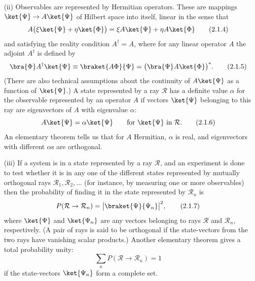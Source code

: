 \medskip
\noindent
(ii) Observables are represented by Hermitian operators. These are
mappings $\ket{\Psi}\to A\ket{\Psi}$ of Hilbert space into itself,
linear in the sense that
\begin{equation}
  A\bigl(\xi\ket{\Psi}+\eta\ket{\Phi}\bigr)
    =\xi A\ket{\Psi}+\eta A\ket{\Phi}
  \tag{2.1.4}\label{eq:2.1.4}
\end{equation}
and satisfying the reality condition $A^{\dagger}=A$, where for any
linear operator $A$ the adjoint $A^{\dagger}$ is defined by
\begin{equation}
  \bra{\Phi}A^{\dagger}\ket{\Psi}
    \equiv \braket{A\Phi}{\Psi}
    =\bigl(\bra{\Psi}A\ket{\Phi}\bigr)^{*}.
  \tag{2.1.5}\label{eq:2.1.5}
\end{equation}
(There are also technical assumptions about the continuity of
$A\ket{\Psi}$ as a function of $\ket{\Psi}$.) A state represented by a ray
$\mathcal{R}$ has a definite value $\alpha$ for the observable represented
by an operator $A$ if vectors $\ket{\Psi}$ belonging to this ray are
eigenvectors of $A$ with eigenvalue $\alpha$:
\begin{equation}
  A\ket{\Psi}=\alpha\ket{\Psi}
  \qquad\text{for $\ket{\Psi}$ in $\mathcal{R}$.}
  \tag{2.1.6}\label{eq:2.1.6}
\end{equation}
An elementary theorem tells us that for $A$ Hermitian, $\alpha$ is real,
and eigenvectors with different $\alpha$s are orthogonal.

\medskip
\noindent
(iii) If a system is in a state represented by a ray $\mathcal{R}$, and an
experiment is done to test whether it is in any one of the different states
represented by mutually orthogonal rays $\mathcal{R}_1,\mathcal{R}_2,\ldots$
(for instance, by measuring one or more observables) then the probability
of finding it in the state represented by $\mathcal{R}_n$ is
\begin{equation}
  P(\mathcal{R}\to\mathcal{R}_n)
    =\bigl|\braket{\Psi}{\Psi_n}\bigr|^2,
  \tag{2.1.7}\label{eq:2.1.7}
\end{equation}
where $\ket{\Psi}$ and $\ket{\Psi_n}$ are any vectors belonging to rays
$\mathcal{R}$ and $\mathcal{R}_n$, respectively. (A pair of rays is said
to be orthogonal if the state-vectors from the two rays have vanishing
scalar products.) Another elementary theorem gives a total probability
unity:
\begin{equation}
  \sum_n P(\mathcal{R}\to\mathcal{R}_n)=1
  \tag{2.1.8}\label{eq:2.1.8}
\end{equation}
if the state-vectors $\ket{\Psi_n}$ form a complete set.

